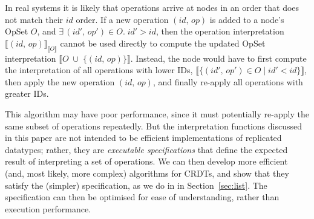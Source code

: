 In real systems it is likely that operations arrive at nodes in an order that does not match their $\mathit{id}$ order.
If a new operation $(\mathit{id},\, \mathit{op})$ is added to a node's OpSet $O$, and $\exists\,(\mathit{id}',\, \mathit{op}') \in O.\; \mathit{id}' > \mathit{id}$,
then the operation interpretation $\llbracket (\mathit{id},\, \mathit{op}) \rrbracket_{\llbracket O \rrbracket}$ cannot be used directly to compute the updated OpSet interpretation
$\llbracket O \;\cup\; \{(\mathit{id},\, \mathit{op})\} \rrbracket$.
Instead, the node would have to first compute the interpretation of all operations with lower IDs,
$\llbracket \{(\mathit{id}',\, \mathit{op}') \in O \mid \mathit{id}' < \mathit{id}\} \rrbracket$,
then apply the new operation $(\mathit{id},\, \mathit{op})$, and finally re-apply all operations with greater IDs.

This algorithm may have poor performance, since it must potentially re-apply the same subset of operations repeatedly.
But the interpretation functions discussed in this paper are not intended to be efficient implementations of replicated datatypes; rather, they are \emph{executable specifications} that define the expected result of interpreting a set of operations.
We can then develop more efficient (and, most likely, more complex) algorithms for CRDTs, and show that they satisfy the (simpler) specification, as we do in in Section~\ref{sec:list}.
The specification can then be optimised for ease of understanding, rather than execution performance.
